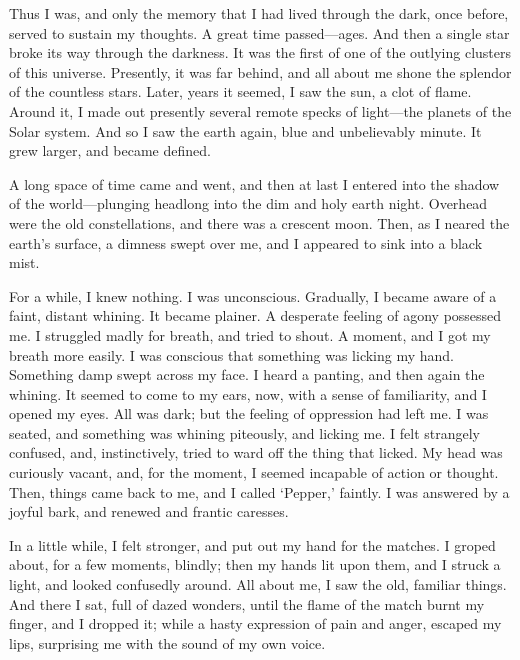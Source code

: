
\clearpage
\label{ch:03}

\begin{ChapterStart}
\null\null
{}
\end{ChapterStart}

Thus I was, and only the memory that I had lived through the dark, once before, served to sustain my thoughts. A great time passed---ages. And then a single star broke its way through the darkness. It was the first of one of the outlying clusters of this universe. Presently, it was far behind, and all about me shone the splendor of the countless stars. Later, years it seemed, I saw the sun, a clot of flame. Around it, I made out presently several remote specks of light---the planets of the Solar system. And so I saw the earth again, blue and unbelievably minute. It grew larger, and became defined.

A long space of time came and went, and then at last I entered into the shadow of the world---plunging headlong into the dim and holy earth night. Overhead were the old constellations, and there was a crescent moon. Then, as I neared the earth’s surface, a dimness swept over me, and I appeared to sink into a black mist.

For a while, I knew nothing. I was unconscious. Gradually, I became aware of a faint, distant whining. It became plainer. A desperate feeling of agony possessed me. I struggled madly for breath, and tried to shout. A moment, and I got my breath more easily. I was conscious that something was licking my hand. Something damp swept across my face. I heard a panting, and then again the whining. It seemed to come to my ears, now, with a sense of familiarity, and I opened my eyes. All was dark; but the feeling of oppression had left me. I was seated, and something was whining piteously, and licking me. I felt strangely confused, and, instinctively, tried to ward off the thing that licked. My head was curiously vacant, and, for the moment, I seemed incapable of action or thought. Then, things came back to me, and I called ‘Pepper,’ faintly. I was answered by a joyful bark, and renewed and frantic caresses.

In a little while, I felt stronger, and put out my hand for the matches. I groped about, for a few moments, blindly; then my hands lit upon them, and I struck a light, and looked confusedly around. All about me, I saw the old, familiar things. And there I sat, full of dazed wonders, until the flame of the match burnt my finger, and I dropped it; while a hasty expression of pain and anger, escaped my lips, surprising me with the sound of my own voice.

